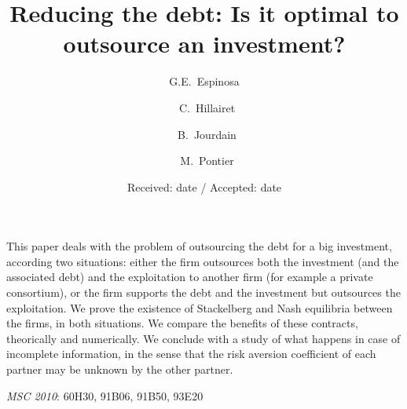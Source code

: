 \documentclass{svjour3}
\begin{document}
{\title{Reducing the debt: Is it optimal to outsource an investment?}}


\author{G.E.~Espinosa  \and ~C.~Hillairet  \and ~B.~Jourdain   \and~M.~Pontier}

    
                       
                       
             

\date{Received: date / Accepted: date}
\maketitle

\abstract
{This paper deals with the problem of outsourcing the debt for a big investment, according two 
situations: either the firm outsources both the investment (and the associated debt) and the exploitation to another firm (for example a  private consortium),
or the firm supports the debt and the investment but outsources the exploitation.
We prove the existence of Stackelberg and Nash  equilibria between the firms,
 in both situations. We compare
the benefits of these  contracts, theorically and numerically. We conclude with a study of what 
happens in case of incomplete information, in the sense that the risk aversion coefficient of each partner may be unknown by the other partner.
}\\
 

{\it MSC 2010}: 60H30, 91B06, 91B50, 93E20 
\end{document}
